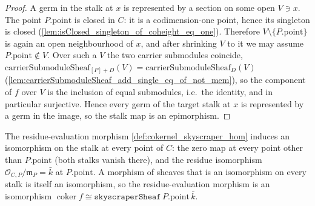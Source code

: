 \begin{proof}
        \leanok
  A germ in the stalk at \(x\) is represented by a section on some open
  \(V \ni x\). The point \(P.\mathrm{point}\) is closed in \(C\): it is a
  codimension-one point, hence its singleton is closed
  (\cref{lem:isClosed_singleton_of_coheight_eq_one}). Therefore
  \(V \setminus \{P.\mathrm{point}\}\) is again an open neighbourhood of \(x\),
  and after shrinking \(V\) to it we may assume \(P.\mathrm{point} \notin V\).
  Over such a \(V\) the two carrier submodules coincide,
  \(\mathrm{carrierSubmoduleSheaf}_{[P]+D}(V) =
  \mathrm{carrierSubmoduleSheaf}_D(V)\)
  (\cref{lem:carrierSubmoduleSheaf_add_single_eq_of_not_mem}), so the component
  of \(f\) over \(V\) is the inclusion of equal submodules, i.e.\ the identity,
  and in particular surjective. Hence every germ of the target stalk at \(x\)
  is represented by a germ in the image, so the stalk map is an epimorphism.
\end{proof}

\begin{lemma}
  \label{lem:cokernel_skyscraper_hom_isIso}
  The residue-evaluation morphism \cref{def:cokernel_skyscraper_hom} induces an
  isomorphism on the stalk at every point of \(C\): the zero map at every point
  other than \(P.\mathrm{point}\) (both stalks vanish there), and the residue
  isomorphism \(\mathcal O_{C,P}/\mathfrak m_P = \bar k\) at
  \(P.\mathrm{point}\). A morphism of sheaves that is an isomorphism on every
  stalk is itself an isomorphism, so the residue-evaluation morphism is an
  isomorphism
  \(\operatorname{coker} f \cong
  \texttt{skyscraperSheaf}\,P.\mathrm{point}\,\bar k\).
\end{lemma}

